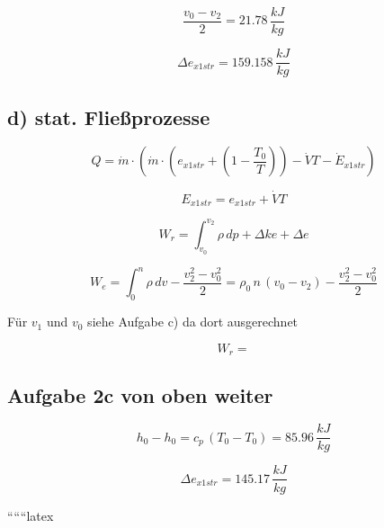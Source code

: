 \[
\frac{v_0 - v_2}{2} = 21.78 \, \frac{kJ}{kg}
\]

\[
\Delta e_{x1str} = 159.158 \, \frac{kJ}{kg}
\]

\subsection*{d) stat. Fließprozesse}

\[
Q = \dot{m} \cdot \left( \dot{m} \cdot \left( e_{x1str} + (1 - \frac{T_0}{T}) \right) - \dot{V} T - \dot{E}_{x1str} \right)
\]

\[
E_{x1str} = e_{x1str} + \dot{V} T
\]

\[
W_r = \int_{v_0}^{v_2} \rho \, dp + \Delta ke + \Delta e
\]

\[
W_e = \int_{0}^{n} \rho \, dv - \frac{v_2^2 - v_0^2}{2} = \rho_0 \, n \, (v_0 - v_2) - \frac{v_2^2 - v_0^2}{2}
\]

Für \(v_1\) und \(v_0\) siehe Aufgabe c) da dort ausgerechnet

\[
W_r =
\]

\subsection*{Aufgabe 2c von oben weiter}

\[
h_0 - h_0 = c_p \, (T_0 - T_0) = 85.96 \, \frac{kJ}{kg}
\]

\[
\Delta e_{x1str} = 145.17 \, \frac{kJ}{kg}
\]

``````latex



